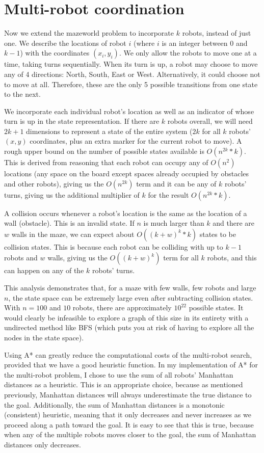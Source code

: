 \documentclass{article}
\begin{document}
\section{Multi-robot coordination}
 
Now we extend the mazeworld problem to incorporate $k$ robots, instead of just one. We describe the locations of robot $i$ (where $i$ is an integer between $0$ and $k - 1$) with the coordinates $(x_i, y_i)$. We only allow the robots to move one at a time, taking turns sequentially. When its turn is up, a robot may choose to move any of 4 directions: North, South, East or West. Alternatively, it could choose not to move at all. Therefore, these are the only 5 possible transitions from one state to the next.

We incorporate each individual robot's location as well as an indicator of whose turn is up in the state representation. If there are $k$ robots overall, we will need $2k + 1$ dimensions to represent a state of the entire system ($2k$ for all $k$ robots' $(x, y)$ coordinates, plus an extra marker for the current robot to move). A rough upper bound on the number of possible states available is $O(n^{2k}*k)$. This is derived from reasoning that each robot can occupy any of $O(n^2)$ locations (any space on the board except spaces already occupied by obstacles and other robots), giving us the $O(n^{2k})$ term and it can be any of $k$ robots' turns, giving us the additional multiplier of $k$ for the result $O(n^{2k}*k)$.

A collision occurs whenever a robot's location is the same as the location of a wall (obstacle). This is an invalid state. If $n$ is much larger than $k$ and there are $w$ walls in the maze, we can expect about $O((k+w)^k*k)$ states to be collision states. This is because each robot can be colliding with up to $k - 1$ robots and $w$ walls, giving us the $O((k+w)^k)$ term for all $k$ robots, and this can happen on any of the $k$ robots' turns.

This analysis demonstrates that, for a maze with few walls, few robots and large $n$, the state space can be extremely large even after subtracting collision states. With $n = 100$ and $10$ robots, there are approximately $10^22$ possible states. It would clearly be infeasible to explore a graph of this size in its entirety with a undirected method like BFS (which puts you at risk of having to explore all the nodes in the state space).

Using A* can greatly reduce the computational costs of the multi-robot search, provided that we have a good heuristic function. In my implementation of A* for the multi-robot problem, I chose to use the sum of all robots' Manhattan distances as a heuristic. This is an appropriate choice, because as mentioned previously, Manhattan distances will always underestimate the true distance to the goal. Additionally, the sum of Manhattan distances is a monotonic (consistent) heuristic, meaning that it only decreases and never increases as we proceed along a path toward the goal. It is easy to see that this is true, because when any of the multiple robots moves closer to the goal, the sum of Manhattan distances only decreases.
\end{document}

